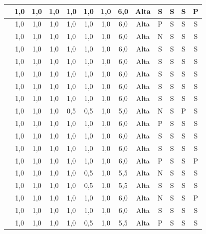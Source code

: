 \begin{scriptsize}
\begin{longtable}{|p{3cm}|c|c|c|c|c|c|c|c|c|c|c|c|}
\cite{morash2015guiding}          & 1,0 & 1,0 & 1,0 & 1,0 & 1,0 & 1,0 & 6,0 & Alta & S & S & S & P \\ \hline
\cite{lum2016development}         & 1,0 & 1,0 & 1,0 & 1,0 & 1,0 & 1,0 & 6,0 & Alta & P & S & S & S \\ \hline
\cite{duarte2025designing}        & 1,0 & 1,0 & 1,0 & 1,0 & 1,0 & 1,0 & 6,0 & Alta & N & S & S & S \\ \hline
\cite{becker2004study}            & 1,0 & 1,0 & 1,0 & 1,0 & 1,0 & 1,0 & 6,0 & Alta & S & S & S & S \\ \hline
\cite{delara2016study}            & 1,0 & 1,0 & 1,0 & 1,0 & 1,0 & 1,0 & 6,0 & Alta & S & S & S & S \\ \hline
\cite{finn2013usability}          & 1,0 & 1,0 & 1,0 & 1,0 & 1,0 & 1,0 & 6,0 & Alta & S & S & S & S \\ \hline
\cite{chiriboga2025accessible}     & 1,0 & 1,0 & 1,0 & 1,0 & 1,0 & 1,0 & 6,0 & Alta & S & S & S & S \\ \hline
\cite{almahmud2022developing}     & 1,0 & 1,0 & 1,0 & 1,0 & 1,0 & 1,0 & 6,0 & Alta & S & S & S & S \\ \hline
\cite{oehme2014easing}            & 1,0 & 1,0 & 1,0 & 0,5 & 0,5 & 1,0 & 5,0 & Alta & N & S & P & S \\ \hline
\cite{adabinejad2026engaging}     & 1,0 & 1,0 & 1,0 & 1,0 & 1,0 & 1,0 & 6,0 & Alta & P & S & S & S \\ \hline
\cite{hart2008evaluating}         & 1,0 & 1,0 & 1,0 & 1,0 & 1,0 & 1,0 & 6,0 & Alta & S & S & S & S \\ \hline
\cite{jonasson2007expert}         & 1,0 & 1,0 & 1,0 & 1,0 & 1,0 & 1,0 & 6,0 & Alta & S & S & S & S \\ \hline
\cite{chittaro2003guiding}        & 1,0 & 1,0 & 1,0 & 1,0 & 1,0 & 1,0 & 6,0 & Alta & P & S & S & P \\ \hline
\cite{darvishy2013inclusive}      & 1,0 & 1,0 & 1,0 & 1,0 & 0,5 & 1,0 & 5,5 & Alta & N & S & S & S \\ \hline
\cite{biswas2014interface}        & 1,0 & 1,0 & 1,0 & 1,0 & 0,5 & 1,0 & 5,5 & Alta & S & S & S & S \\ \hline
\cite{nabok2026navigating}        & 1,0 & 1,0 & 1,0 & 1,0 & 1,0 & 1,0 & 6,0 & Alta & N & S & S & P \\ \hline
\cite{patsoule2012redesigning}    & 1,0 & 1,0 & 1,0 & 1,0 & 1,0 & 1,0 & 6,0 & Alta & S & S & S & S \\ \hline
\cite{gautam2019adding}           & 1,0 & 1,0 & 1,0 & 1,0 & 0,5 & 1,0 & 5,5 & Alta & P & S & S & S \\ \hline

\end{longtable}
\end{scriptsize}
